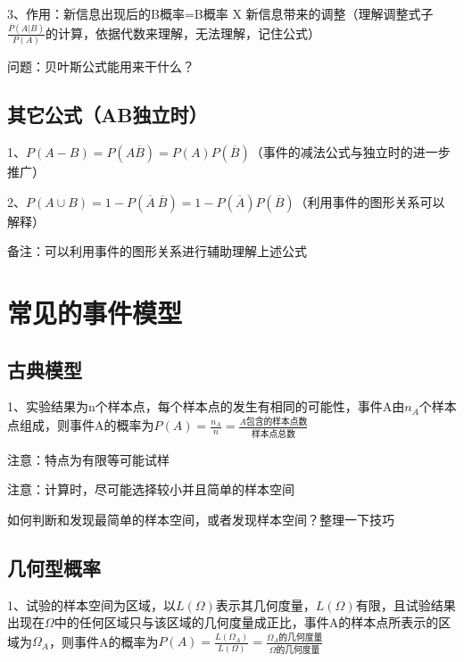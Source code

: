 3、作用：新信息出现后的B概率=B概率 X 新信息带来的调整（理解调整式子$\frac{P(A|B)}{P(A)}$的计算，依据代数来理解，无法理解，记住公式）

问题：贝叶斯公式能用来干什么？



\subsection{其它公式（AB独立时）}

1、$P(A-B) = P(A\overline B)=P(A)P(\overline B)$（事件的减法公式与独立时的进一步推广）

2、$P(A\cup B) = 1-P(\overline A \  \overline B) = 1-P(\overline A)P(  \overline B)$（利用事件的图形关系可以解释）



备注：可以利用事件的图形关系进行辅助理解上述公式

\section{常见的事件模型}



\subsection{古典模型}

1、实验结果为n个样本点，每个样本点的发生有相同的可能性，事件A由$n_A$个样本点组成，则事件A的概率为$P(A) = \frac{n_A}{n} = \frac{A包含的样本点数}{样本点总数}$

注意：特点为有限等可能试样

注意：计算时，尽可能选择较小并且简单的样本空间

如何判断和发现最简单的样本空间，或者发现样本空间？整理一下技巧



\subsection{几何型概率}

1、试验的样本空间为区域，以$L(\Omega)$表示其几何度量，$L(\Omega)$有限，且试验结果出现在$\Omega$中的任何区域只与该区域的几何度量成正比，事件A的样本点所表示的区域为$\Omega _A$，则事件A的概率为$P(A) = \frac{L(\Omega _A)}{L(\Omega)} = \frac{\Omega _A的几何度量}{\Omega 的几何度量}$

